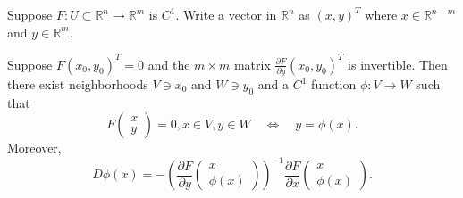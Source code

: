 \documentclass[12pt]{article}
\begin{document}
\begin{theorem}
	Suppose $F:U\subset\mathbb{R}^n\to\mathbb{R}^m$ is $C^1$. Write a vector in $\mathbb{R}^n$ as $(x,y)^T$ where $x\in\mathbb{R}^{n-m}$ and $y\in\mathbb{R}^m$.	

	Suppose $F(x_0,y_0)^T=0$ and the $m\times m$ matrix $\frac{\partial F}{\partial y}(x_0, y_0)^T$ is invertible. Then there exist neighborhoods $V\ni x_0$ and $W\ni y_0$ and a $C^1$ function $\phi:V\to W$ such that 
	\begin{equation*}
		F\begin{pmatrix}x\\ y\end{pmatrix}=0, x\in V, y\in W \quad \Leftrightarrow \quad y=\phi(x).
	\end{equation*}
	Moreover, 
	\begin{equation*}
		D\phi(x) = -\left( \frac{\partial F}{\partial y}\begin{pmatrix}x \\ \phi(x)\end{pmatrix}\right)^{-1} \frac{\partial F}{\partial x}\begin{pmatrix}x \\ \phi(x) \end{pmatrix}.
	\end{equation*}
\end{theorem}
\end{document}
